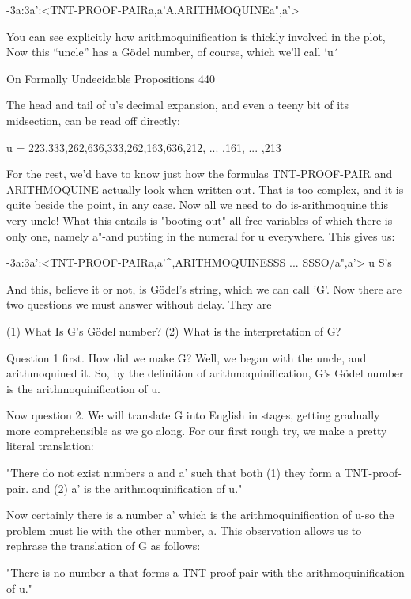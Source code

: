           -3a:3a':<TNT-PROOF-PAIR{a,a'}A.ARITHMOQUINE{a",a'}>

You can see explicitly how arithmoquinification is thickly involved in the plot, Now this
“uncle” has a Gödel number, of course, which we’ll call `u´




On Formally Undecidable Propositions                                                   440

The head and tail of u's decimal expansion, and even a teeny bit of its midsection, can be
read off directly:

               u = 223,333,262,636,333,262,163,636,212, ... ,161, ... ,213

For the rest, we'd have to know just how the formulas TNT-PROOF-PAIR and
ARITHMOQUINE actually look when written out. That is too complex, and it is quite
beside the point, in any case.
        Now all we need to do is-arithmoquine this very uncle! What this entails is
"booting out" all free variables-of which there is only one, namely a"-and putting in the
numeral for u everywhere. This gives us:

   -3a:3a':<TNT-PROOF-PAIR{a,a'}^,ARITHMOQUINE{SSS ... SSSO/a",a'}>
                                                          u S's

And this, believe it or not, is Gödel’s string, which we can call 'G'. Now there are two
questions we must answer without delay. They are

       (1) What Is G's Gödel number?
       (2) What is the interpretation of G?

Question 1 first. How did we make G? Well, we began with the uncle, and arithmoquined
it. So, by the definition of arithmoquinification, G's Gödel number is
                              the arithmoquinification of u.

Now question 2. We will translate G into English in stages, getting gradually more
comprehensible as we go along. For our first rough try, we make a pretty literal
translation:

       "There do not exist numbers a and a' such that both (1) they form a TNT-proof-
       pair. and (2) a' is the arithmoquinification of u."

Now certainly there is a number a' which is the arithmoquinification of u-so the problem
must lie with the other number, a. This observation allows us to rephrase the translation
of G as follows:

       "There is no number a that forms a TNT-proof-pair with the arithmoquinification
       of u."

